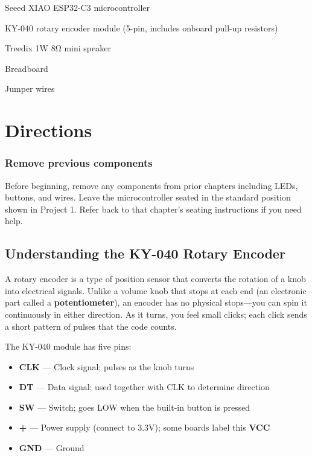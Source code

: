\begin{components}
    \item Seeed XIAO ESP32-C3 microcontroller
    \item KY-040 rotary encoder module (5-pin, includes onboard pull-up resistors)
    \item Treedix 1W 8\si{\ohm} mini speaker
    \item Breadboard
    \item Jumper wires
\end{components}

\section{Directions}

\subsubsection{Remove previous components}
Before beginning, remove any components from prior chapters including LEDs, buttons, and wires.
Leave the microcontroller seated in the standard position shown in Project 1. Refer back to
that chapter's seating instructions if you need help.

\subsection{Understanding the KY-040 Rotary Encoder}

A rotary encoder is a type of position sensor that converts the rotation of a knob into electrical
signals. Unlike a volume knob that stops at each end (an electronic part called a
\textbf{potentiometer}), an encoder has no physical stops---you can spin it continuously in either
direction. As it turns, you feel small clicks; each click sends a short pattern of pulses that the
code counts.

The KY-040 module has five pins:
\begin{itemize}
    \item \textbf{CLK} — Clock signal; pulses as the knob turns
    \item \textbf{DT} — Data signal; used together with CLK to determine direction
    \item \textbf{SW} — Switch; goes LOW when the built-in button is pressed
    \item \textbf{+} — Power supply (connect to 3.3V); some boards label this \textbf{VCC}
    \item \textbf{GND} — Ground
\end{itemize}

